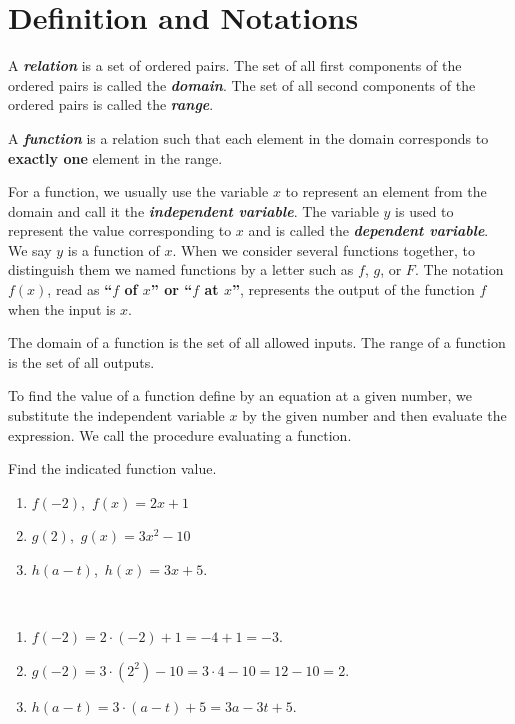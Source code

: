 \documentclass[en,11pt]{elegantbook}
\let\BeginKnitrBlock\begin \let\EndKnitrBlock\end
\begin{document}
\hypertarget{definition-and-notations}{%
\section{Definition and Notations}\label{definition-and-notations}}

A \textbf{\emph{relation}} is a set of ordered pairs. The set of all first components of the ordered pairs is called the \textbf{\emph{domain}}. The set of all second components of the ordered pairs is called the \textbf{\emph{range}}.

A \textbf{\emph{function}} is a relation such that each element in the domain corresponds to \textbf{exactly one} element in the range.

For a function, we usually use the variable \(x\) to represent an element from the domain and call it the \textbf{\emph{independent variable}}. The variable \(y\) is used to represent the value corresponding to \(x\) and is called the \textbf{\emph{dependent variable}}. We say \(y\) is a function of \(x\). When we consider several functions together, to distinguish them we named functions by a letter such as \(f\), \(g\), or \(F\). The notation \(f(x)\), read as \textbf{``\(f\) of \(x\)'' or ``\(f\) at \(x\)''}, represents the output of the function \(f\) when the input is \(x\).

The domain of a function is the set of all allowed inputs. The range of a function is the set of all outputs.

To find the value of a function define by an equation at a given number, we substitute the independent variable \(x\) by the given number and then evaluate the expression. We call the procedure evaluating a function.

\BeginKnitrBlock{example}
\protect\hypertarget{exm:unnamed-chunk-218}{}{\label{exm:unnamed-chunk-218} }
Find the indicated function value.

\begin{enumerate}
\def\labelenumi{\arabic{enumi}.}

\item
  \(f(-2)\),~\(f(x)=2x+1\)
\item
  \(g(2)\),~\(g(x)=3x^2-10\)
\item
  \(h(a-t)\),~\(h(x)=3x+5\).
\end{enumerate}
\EndKnitrBlock{example}

\BeginKnitrBlock{solution}
{}\\

\begin{enumerate}
\def\labelenumi{\arabic{enumi}.}

\item
  \(f(-2)=2\cdot(-2)+1=-4+1=-3\).
\item
  \(g(-2)=3\cdot(2^2)-10=3\cdot 4-10=12-10=2\).
\item
  \(h(a-t)=3\cdot(a-t)+5=3a-3t+5\).
\end{enumerate}
\EndKnitrBlock{solution}
\end{document}
